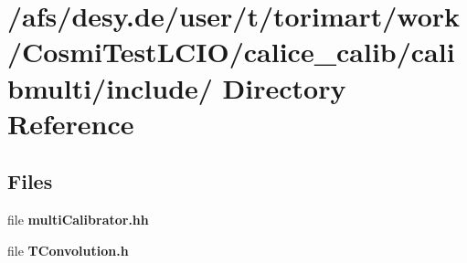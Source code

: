 \section{/afs/desy.de/user/t/torimart/work/CosmiTestLCIO/calice\_\-calib/calibmulti/include/ Directory Reference}
\label{dir_c25c3d29473d4c42bb0a9d5df4da90fb}
\subsection*{Files}
\begin{DoxyCompactItemize}
\item 
file {\bfseries multiCalibrator.hh}
\item 
file {\bfseries TConvolution.h}
\end{DoxyCompactItemize}
